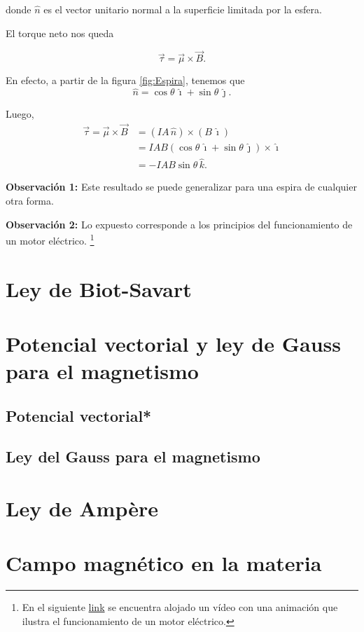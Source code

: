 donde $\hat{n}$ es el vector unitario normal a la superficie limitada por la esfera.

El torque neto nos queda
\begin{shaded}
    $$\vec{\tau} = \vec{\mu} \times \vec{B}.$$
\end{shaded}

En efecto, a partir de la figura \ref{fig:Espira}, tenemos que
$$\hat{n} = \cos \theta \,\hat{\imath} + \sin\theta \,\hat{\jmath}.$$

Luego,
\begin{align*}
   \vec{\tau} = \vec{\mu} \times \vec{B} &= (IA \,\hat{n}) \times (B\,\hat{\imath}) \\
   &= IA B (\cos \theta \,\hat{\imath} + \sin  \theta \,\hat{\jmath}) \times \hat{\imath} \\
   &= - IAB \sin \theta\,\hat{k}.
\end{align*}

\textbf{Observación 1:} Este resultado se puede generalizar para una espira de cualquier otra forma.

\textbf{Observación 2:} Lo expuesto corresponde a los principios del funcionamiento de un motor eléctrico. \footnote{En el siguiente \href{https://youtu.be/24lasu4V8NI}{link} se encuentra alojado un vídeo con una animación que ilustra el funcionamiento de un motor eléctrico.}

\section{Ley de Biot-Savart}

\section{Potencial vectorial y ley de Gauss para el magnetismo}

\subsection{Potencial vectorial*}

\subsection{Ley del Gauss para el magnetismo}

\section{Ley de Ampère}

\section{Campo magnético en la materia}



